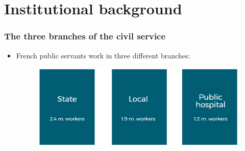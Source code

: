 \documentclass[xcolor=table,ignorenonframetext,12pt]{beamer}
\begin{document}





\section{Institutional background}


\begin{frame}
\frametitle{The three branches of the civil service}
\begin{itemize}
	\item French public servants work in three different branches:\\
\vspace{-0.1cm}
\begin{center}
	\begin{figure}
		\includegraphics[width=.95\textwidth]{Graphiques/versant.png}
	\end{figure}
\end{center}
\end{itemize}
\end{frame}
\end{document}

